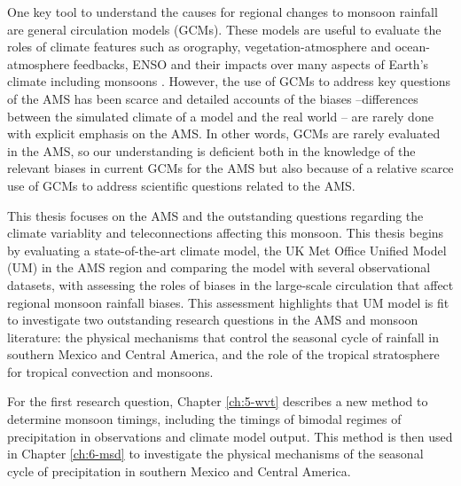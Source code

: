 

One key tool to understand the causes for regional changes to monsoon rainfall are general circulation models (GCMs). These models are useful to evaluate the roles of climate features such as orography, vegetation-atmosphere and ocean-atmosphere feedbacks, ENSO and their impacts over many aspects of Earth's climate including monsoons \citep{zhou2016}. However, the use of GCMs to address key questions of the AMS has been scarce and detailed accounts of the biases --differences between the simulated climate of a model and the real world -- are rarely done with explicit emphasis on the AMS. 
In other words, GCMs are rarely evaluated in the AMS, so our understanding is deficient both in the knowledge of the relevant biases in current GCMs for the AMS but also because of a relative scarce use of GCMs to address scientific questions related to the AMS. 


 This thesis focuses on the AMS and the outstanding questions regarding the climate variablity and teleconnections affecting this monsoon.
 This thesis begins  by evaluating a state-of-the-art climate model, the UK Met Office Unified Model (UM) in the AMS region and comparing the model with several observational datasets, with assessing the roles of biases in the large-scale circulation that affect regional monsoon rainfall biases.
 This assessment highlights that UM model is fit to investigate two outstanding research questions in the AMS and monsoon literature: the physical mechanisms that control the seasonal cycle of rainfall in southern Mexico and Central America, and the role of the tropical stratosphere for tropical convection and monsoons. 
 
 For the first research question, Chapter \ref{ch:5-wvt} describes a new method to determine monsoon timings, including the timings of bimodal regimes of precipitation in observations and climate model output. This method is then used in Chapter \ref{ch:6-msd} to investigate the physical mechanisms of the seasonal cycle of precipitation in southern Mexico and Central America.
 

